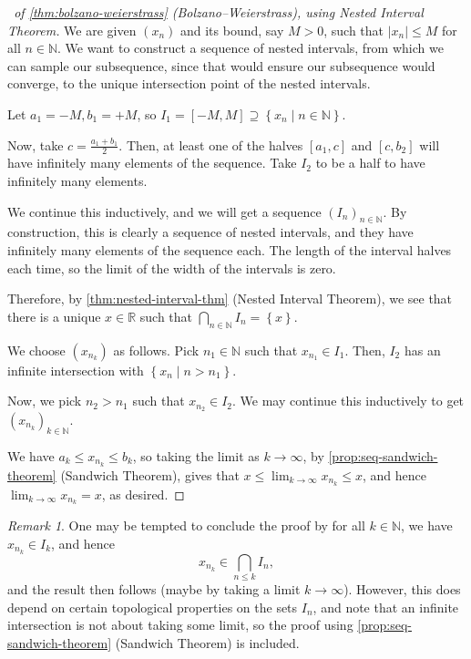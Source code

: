 \documentclass[11pt]{article}
\numberwithin{equation}{section}
\theoremstyle{definition}
\theoremstyle{remark}
\newtheorem{remark}[theorem]{Remark}
\newcommand{\pqty}[1]{\left(#1\right)}
\newcommand{\Bqty}[1]{\left\{#1\right\}}
\newcommand{\abs}[1]{\left|#1\right|}
\newcommand{\set}[2]{\left\{#1\mid #2\right\}}
\newcommand{\ccintv}[2]{[#1,#2]}
\newcommand{\RR}{\mathbb R}
\newcommand{\NN}{\mathbb N}
\begin{document}
\begin{proof}[\proofname\ of \autoref{thm:bolzano-weierstrass} (Bolzano--Weierstrass), using Nested Interval Theorem]
    We are given \(\pqty{x_n}\) and its bound, say \(M > 0\), such that \(\abs{x_n} \leq M\) for all \(n \in \NN\). We want to construct a sequence of nested intervals, from which we can sample our subsequence, since that would ensure our subsequence would converge, to the unique intersection point of the nested intervals.

    Let \(a_1 = -M, b_1 = +M\), so \(I_1 = \ccintv{-M}{M} \supseteq \set{x_n}{n \in \NN}\).

    Now, take \(c = \frac{a_1 + b_1}{2}\). Then, at least one of the halves \(\ccintv{a_1}{c}\) and \(\ccintv{c}{b_2}\) will have infinitely many elements of the sequence. Take \(I_2\) to be a half to have infinitely many elements.

    We continue this inductively, and we will get a sequence \(\pqty{I_n}_{n \in \NN}\). By construction, this is clearly a sequence of nested intervals, and they have infinitely many elements of the sequence each. The length of the interval halves each time, so the limit of the width of the intervals is zero.

    Therefore, by \autoref{thm:nested-interval-thm} (Nested Interval Theorem), we see that there is a unique \(x \in \RR\) such that \(\bigcap_{n \in \NN} I_n = \Bqty{x}\).

    We choose \(\pqty{x_{n_k}}\) as follows. Pick \(n_1 \in \NN\) such that \(x_{n_1} \in I_1\). Then, \(I_2\) has an infinite intersection with \(\set{x_n}{n > n_1}\).

    Now, we pick \(n_2 > n_1\) such that \(x_{n_2} \in I_2\). We may continue this inductively to get \(\pqty{x_{n_k}}_{k \in \NN}\).

    We have \(a_k \leq x_{n_k} \leq b_k\), so taking the limit as \(k \to \infty\), by \autoref{prop:seq-sandwich-theorem} (Sandwich Theorem), gives that \(x \leq \lim_{k \to \infty} x_{n_k} \leq x\), and hence \(\lim_{k \to \infty} x_{n_k} = x\), as desired.
\end{proof}

\begin{remark}\label{analysis-unit-0020}
    One may be tempted to conclude the proof by for all \(k \in \NN\), we have \(x_{n_k} \in I_k\), and hence
    \[
        x_{n_k} \in \bigcap_{n \leq k} I_n,
    \]
    and the result then follows (maybe by taking a limit \(k \to \infty\)). However, this does depend on certain topological properties on the sets \(I_n\), and note that an infinite intersection is not about taking some limit, so the proof using \autoref{prop:seq-sandwich-theorem} (Sandwich Theorem) is included.
\end{remark}
\end{document}
